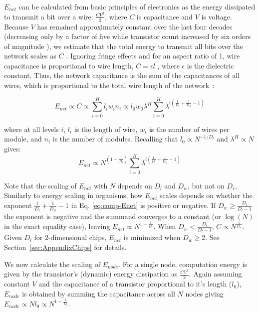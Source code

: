 \documentclass[12pt]{article}
\begin{document}
$E_{net}$ can be calculated from basic principles of electronics as the energy
dissipated to transmit a bit over a wire: $\frac{CV^2}{2}$, where $C$ is
capacitance and $V$ is voltage.  Because $V$ has remained approximately
constant over the last four decades (decreasing only by a factor of five while
transistor count increased by six orders of magnitude \cite{ning07}), we
estimate that the total energy to transmit all bits over the network scales as
$C$ \cite{bingham08}.  Ignoring fringe effects and for an aspect ratio of 1,
wire capacitance is proportional to wire length, $C = \epsilon l$
\cite{wilhelm95}, where $\epsilon$ is the dielectric constant. Thus, the
network capacitance is the sum of the capacitances of all wires, which is
proportional to the total wire length of the network~\cite{donath79}:

\begin{equation}
  \label{eq:ChipsEnet}
  E_{net} \propto C \propto  \sum_{i=0}^H l_i w_i n_i \propto l_0 w_0 \lambda^H
\sum_{i=0}^H \lambda^{i \left( \frac{1}{D_l} + \frac{1}{D_w} -1 \right)}
\end{equation}

\noindent where at all levels $i$, $l_i$ is the length of wire, $w_i$ is the number of wires per
module, and $n_i$ is the number of modules. Recalling that
$l_0 \propto N^{-1/D_l}$ and $\lambda^H \propto N$ gives: 
\begin{equation}
\label{eq:comp-Enet}
  E_{net}  \propto  N^{(1- \frac{1}{D_l})} \sum_{i=0}^H \lambda^{i \left( 
\frac{1}{D_l} + \frac{1}{D_w} -1 \right)}
\end{equation}

\noindent Note that the scaling of $E_{net} $ with $N$ depends on $D_l$ and
$D_w$, but not on $D_r$. Similarly to energy scaling in
organisms, how $E_{net}$ scales depends on whether the exponent
$\frac{1}{D_l} + \frac{1}{D_w}-1$ in Eq. \ref {eq:comp-Enet} is positive or
negative.  If $D_w \geq \frac{D_l}{D_l -1}$ the exponent is negative and the
summand converges to a constant (or $\log(N)$ in the exact equality case),
leaving $E_{net} \propto N^{1-\frac{1}{D_l}}$. When $D_w < \frac{D_l}{D_l -1}$,
$C \propto N^{\frac{1}{D_w}}$. Given $D_l$ for 2-dimensional chips, $E_{net}$
is minimized when $D_w \geq 2$. See Section~\ref{sec:AppendixChips} for
details.

We now calculate the scaling of $E_{node}$. 
For a single node, computation
energy is given by the transistor's (dynamic) energy dissipation as
$\frac{CV^2}{2}$. Again assuming constant $V$ and the capacitance of a
transistor proportional to it's length ($l_0$), $E_{node}$ is obtained
by summing
the capacitance across all $N$ nodes giving $E_{node} \propto N l_0  \propto
N^{1-\frac{1}{D_l}}$. 
\end{document}
